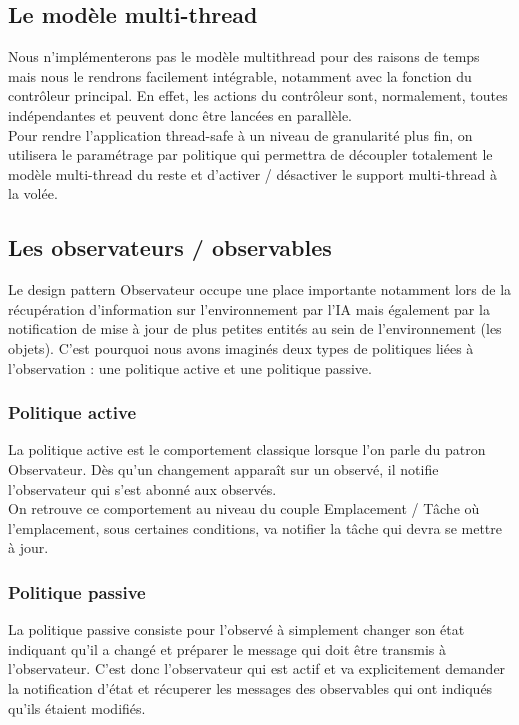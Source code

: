 \subsection{Le modèle multi-thread}
Nous n'implémenterons pas le modèle multithread pour des raisons de temps mais nous le rendrons facilement intégrable, notamment avec la fonction du contrôleur principal. En effet, les actions du contrôleur sont, normalement, toutes indépendantes et peuvent donc être lancées en parallèle.\\

Pour rendre l'application thread-safe à un niveau de granularité plus fin, on utilisera le paramétrage par politique qui permettra de découpler totalement le modèle multi-thread du reste et d'activer / désactiver le support multi-thread à la volée.

\subsection{Les observateurs / observables}
Le design pattern Observateur occupe une place importante notamment lors de la récupération d'information sur l'environnement par l'IA mais également par la notification de mise à jour de plus petites entités au sein de l'environnement (les objets). C'est pourquoi nous avons imaginés deux types de politiques liées à l'observation : une politique active et une politique passive.

\subsubsection{Politique active}

La politique active est le comportement classique lorsque l'on parle du patron Observateur. Dès qu'un changement apparaît sur un observé, il notifie l'observateur qui s'est abonné aux observés.\\
On retrouve ce comportement au niveau du couple Emplacement / Tâche où l'emplacement, sous certaines conditions, va notifier la tâche qui devra se mettre à jour.

\subsubsection{Politique passive}

La politique passive consiste pour l'observé à simplement changer son état indiquant qu'il a changé et préparer le message qui doit être transmis à l'observateur. C'est donc l'observateur qui est actif et va explicitement demander la notification d'état et récuperer les messages des observables qui ont indiqués qu'ils étaient modifiés.\\

